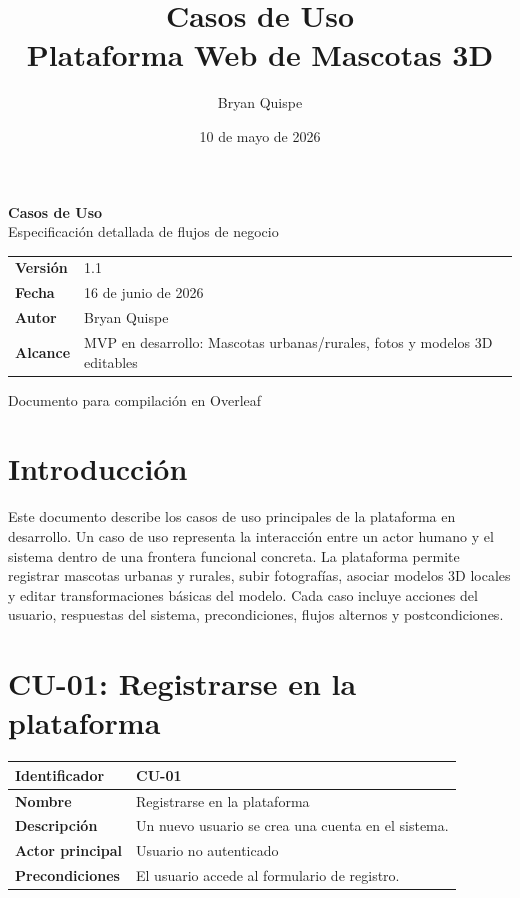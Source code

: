 \documentclass[12pt,a4paper]{article}
\title{\Huge\textbf{Casos de Uso}\\[0.3em]\Large Plataforma Web de Mascotas 3D}
\author{Bryan Quispe}
\date{10 de mayo de 2026}
\begin{document}
\begin{titlepage}
\centering
\vspace*{1.8cm}
{\Huge\bfseries\color{PrimaryBlue} Casos de Uso\\[0.35em]}
{\LARGE Especificaci\'on detallada de flujos de negocio\\[1.2cm]}

\begin{tabular}{p{5cm} p{8cm}}
\rowcolor{SoftGray}
\textbf{Versi\'on} & 1.1 \\
\textbf{Fecha} & 16 de junio de 2026 \\
\textbf{Autor} & Bryan Quispe \\
\textbf{Alcance} & MVP en desarrollo: Mascotas urbanas/rurales, fotos y modelos 3D editables \\
\end{tabular}

\vfill
{\large Documento para compilaci\'on en Overleaf}
\end{titlepage}

\tableofcontents
\newpage

\section{Introducci\'on}
Este documento describe los casos de uso principales de la plataforma en desarrollo. Un caso de uso representa la interacci\'on entre un actor humano y el sistema dentro de una frontera funcional concreta. La plataforma permite registrar mascotas urbanas y rurales, subir fotograf\'ias, asociar modelos 3D locales y editar transformaciones b\'asicas del modelo. Cada caso incluye acciones del usuario, respuestas del sistema, precondiciones, flujos alternos y postcondiciones.

\section{CU-01: Registrarse en la plataforma}

\begin{tabular}{|p{3.5cm}|p{10cm}|}
\hline
\textbf{Identificador} & CU-01 \\
\hline
\textbf{Nombre} & Registrarse en la plataforma \\
\hline
\textbf{Descripci\'on} & Un nuevo usuario se crea una cuenta en el sistema. \\
\hline
\textbf{Actor principal} & Usuario no autenticado \\
\hline
\textbf{Precondiciones} & El usuario accede al formulario de registro. \\
\hline
\end{tabular}
\end{document}
